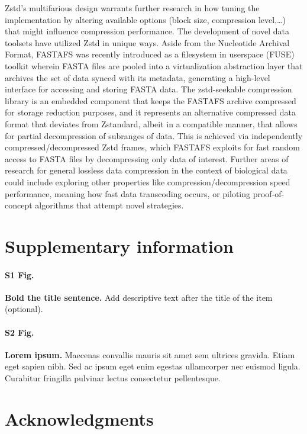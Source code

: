 \documentclass[
  10pt,
  letterpaper,
]{article}
\begin{document}
Zstd's multifarious design warrants further research in how tuning the
implementation by altering available options (block size, compression
level,\ldots) that might influence compression performance. The
development of novel data toolsets have utilized Zstd in unique ways.
Aside from the Nucleotide Archival Format, FASTAFS was recently
introduced as a filesystem in userspace (FUSE) toolkit wherein FASTA
files are pooled into a virtualization abstraction layer that archives
the set of data synced with its metadata, generating a high-level
interface for accessing and storing FASTA data\citep{fastafs}. The
zstd-seekable compression library is an embedded component that keeps
the FASTAFS archive compressed for storage reduction purposes, and it
represents an alternative compressed data format that deviates from
Zstandard, albeit in a compatible manner, that allows for partial
decompression of subranges of data\citep{facebook}. This is achieved via
independently compressed/decompressed Zstd frames, which FASTAFS
exploits for fast random access to FASTA files by decompressing only
data of interest. Further areas of research for general lossless data
compression in the context of biological data could include exploring
other properties like compression/decompression speed performance,
meaning how fast data transcoding occurs, or piloting proof-of-concept
algorithms that attempt novel strategies.

\hypertarget{supplementary-information}{%
\section{Supplementary information}\label{supplementary-information}}

\paragraph*{S1 Fig.}
\label{s1-fig}
{\textbf{Bold the title sentence.}} Add descriptive text after the title
of the item (optional).

\paragraph*{S2 Fig.}
\label{s2-fig}
{\textbf{Lorem ipsum.}} Maecenas convallis mauris sit amet sem ultrices
gravida. Etiam eget sapien nibh. Sed ac ipsum eget enim egestas
ullamcorper nec euismod ligula. Curabitur fringilla pulvinar lectus
consectetur pellentesque.

\hypertarget{acknowledgments}{%
\section{Acknowledgments}\label{acknowledgments}}
\end{document}
